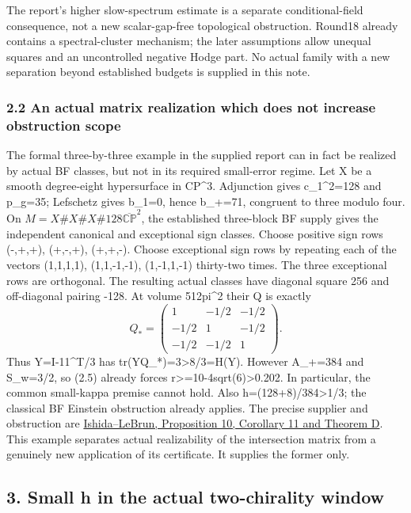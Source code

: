 \documentclass[
  10pt,
]{article}
\begin{document}
The report's higher slow-spectrum estimate is a separate
conditional-field consequence, not a new scalar-gap-free topological
obstruction. Round18 already contains a spectral-cluster mechanism; the
later assumptions allow unequal squares and an uncontrolled negative
Hodge part. No actual family with a new separation beyond established
budgets is supplied in this note.

\hypertarget{an-actual-matrix-realization-which-does-not-increase-obstruction-scope}{%
\subsubsection{2.2 An actual matrix realization which does not increase
obstruction
scope}\label{an-actual-matrix-realization-which-does-not-increase-obstruction-scope}}

The formal three-by-three example in the supplied report can in fact be
realized by actual BF classes, but not in its required small-error
regime. Let X be a smooth degree-eight hypersurface in CP\^{}3.
Adjunction gives c\_1\^{}2=128 and p\_g=35; Lefschetz gives b\_1=0,
hence b\_+=71, congruent to three modulo four. On
\(M=X\#X\#X\#128\overline{\mathbb{CP}}^2\), the established three-block
BF supply gives the independent canonical and exceptional sign classes.
Choose positive sign rows (-,+,+), (+,-,+), (+,+,-). Choose exceptional
sign rows by repeating each of the vectors (1,1,1,1), (1,1,-1,-1),
(1,-1,1,-1) thirty-two times. The three exceptional rows are orthogonal.
The resulting actual classes have diagonal square 256 and off-diagonal
pairing -128. At volume 512pi\^{}2 their Q is exactly \[
 Q_* = \begin{pmatrix}1&-1/2&-1/2\\-1/2&1&-1/2\\-1/2&-1/2&1\end{pmatrix}.
\] Thus Y=I-11\^{}T/3 has tr(YQ\_*)=3\textgreater8/3=H(Y). However
A\_+=384 and S\_w=3/2, so (2.5) already forces
r\textgreater=10-4sqrt(6)\textgreater0.202. In particular, the common
small-kappa premise cannot hold. Also h=(128+8)/384\textgreater1/3; the
classical BF Einstein obstruction already applies. The precise supplier
and obstruction are
\href{https://arxiv.org/pdf/math/0111228}{Ishida--LeBrun, Proposition
10, Corollary 11 and Theorem D}. This example separates actual
realizability of the intersection matrix from a genuinely new
application of its certificate. It supplies the former only.

\hypertarget{small-h-in-the-actual-two-chirality-window}{%
\subsection{3. Small h in the actual two-chirality
window}\label{small-h-in-the-actual-two-chirality-window}}
\end{document}
